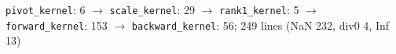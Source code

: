 \texttt{pivot\_kernel}: 6 $\to$ \texttt{scale\_kernel}: 29 $\to$ \texttt{rank1\_kernel}: 5 $\to$ \texttt{forward\_kernel}: 153 $\to$ \texttt{backward\_kernel}: 56; 249 lines (NaN 232, div0 4, Inf 13)
